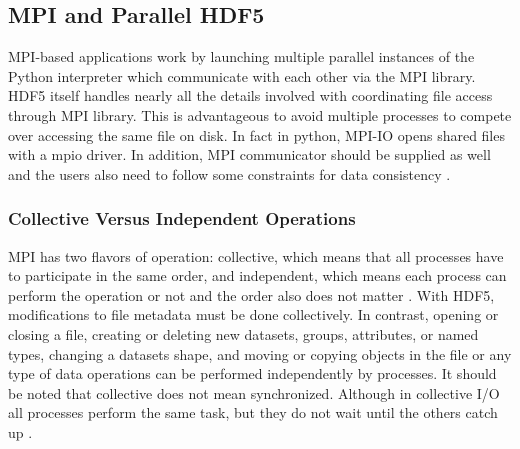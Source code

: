\subsection{MPI and Parallel HDF5}
MPI-based applications work by launching multiple parallel instances of the Python interpreter which communicate with each other via the MPI library. 
HDF5 itself handles nearly all the details involved with coordinating file access through MPI library.
This is advantageous to avoid multiple processes to compete over accessing the same file on disk. 
In fact in python, MPI-IO opens shared files with a mpio driver. 
In addition,  MPI communicator should be supplied as well and the users also need to follow some constraints for data consistency \cite{pythonhdf5}.

\subsubsection{Collective Versus Independent Operations} 
MPI has two flavors of operation: collective, which means that all processes have to participate in the same order, and independent, which means each process can perform the operation or not and the order also does not matter  \cite{pythonhdf5}.
With HDF5, modifications to file metadata must be done collectively. 
In contrast, opening or closing a file, creating or deleting new datasets, groups, attributes, or named types, changing a datasets shape, and moving or copying objects in the file or any type of data operations can be performed independently by processes.
It should be noted that collective does not mean synchronized.
Although in collective I/O all processes perform the same task, but they do not wait until the others catch up \cite{pythonhdf5}. 
